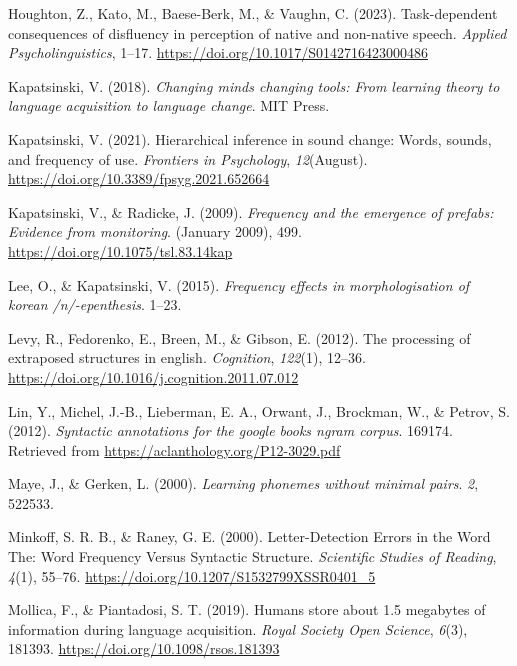 \documentclass[
  man,floatsintext]{apa6}
\newlength{\cslhangindent}
\newenvironment{CSLReferences}[2] %
 {\begin{list}{}{%
  \setlength{\itemindent}{0pt}
  \setlength{\leftmargin}{0pt}
  \setlength{\parsep}{0pt}
  \ifodd #1
   \setlength{\leftmargin}{\cslhangindent}
   \setlength{\itemindent}{-1\cslhangindent}
  \fi
  \setlength{\itemsep}{#2\baselineskip}}}
 {\end{list}}
\begin{document}
\begin{CSLReferences}{1}{0}
Houghton, Z., Kato, M., Baese-Berk, M., \& Vaughn, C. (2023). Task-dependent consequences of disfluency in perception of native and non-native speech. \emph{Applied Psycholinguistics}, 1--17. \url{https://doi.org/10.1017/S0142716423000486}

Kapatsinski, V. (2018). \emph{Changing minds changing tools: From learning theory to language acquisition to language change}. MIT Press.

Kapatsinski, V. (2021). Hierarchical inference in sound change: Words, sounds, and frequency of use. \emph{Frontiers in Psychology}, \emph{12}(August). \url{https://doi.org/10.3389/fpsyg.2021.652664}

Kapatsinski, V., \& Radicke, J. (2009). \emph{Frequency and the emergence of prefabs: Evidence from monitoring}. (January 2009), 499. \url{https://doi.org/10.1075/tsl.83.14kap}

Lee, O., \& Kapatsinski, V. (2015). \emph{Frequency effects in morphologisation of korean /n/-epenthesis}. 1--23.

Levy, R., Fedorenko, E., Breen, M., \& Gibson, E. (2012). The processing of extraposed structures in english. \emph{Cognition}, \emph{122}(1), 12--36. \url{https://doi.org/10.1016/j.cognition.2011.07.012}

Lin, Y., Michel, J.-B., Lieberman, E. A., Orwant, J., Brockman, W., \& Petrov, S. (2012). \emph{Syntactic annotations for the google books ngram corpus}. 169174. Retrieved from \url{https://aclanthology.org/P12-3029.pdf}

Maye, J., \& Gerken, L. (2000). \emph{Learning phonemes without minimal pairs}. \emph{2}, 522533.

Minkoff, S. R. B., \& Raney, G. E. (2000). Letter-Detection Errors in the Word The: Word Frequency Versus Syntactic Structure. \emph{Scientific Studies of Reading}, \emph{4}(1), 55--76. \url{https://doi.org/10.1207/S1532799XSSR0401_5}

Mollica, F., \& Piantadosi, S. T. (2019). Humans store about 1.5 megabytes of information during language acquisition. \emph{Royal Society Open Science}, \emph{6}(3), 181393. \url{https://doi.org/10.1098/rsos.181393}


\end{CSLReferences}
\end{document}

